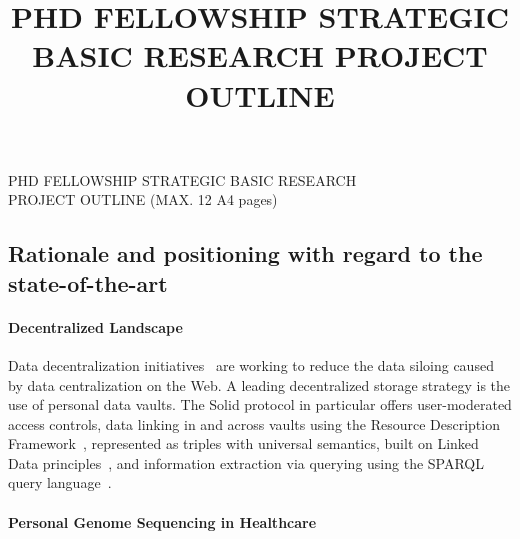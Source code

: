 \documentclass[a4paper,11pt]{article}
\begin{document}
\begin{mdframed}[backgroundcolor=black!17,linecolor=black!0,font=\bfseries]
	\centering
	PHD FELLOWSHIP STRATEGIC BASIC RESEARCH\\
	PROJECT OUTLINE (MAX. 12 A4 pages)\\
	\end{mdframed}
	\vspace{-.5\baselineskip}
\title{PHD FELLOWSHIP STRATEGIC BASIC RESEARCH PROJECT OUTLINE}

\begin{refsection}

\section{Rationale and positioning with regard to the state-of-the-art}

\smallskip

\paragraph{Decentralized Landscape}
Data decentralization initiatives~\cite{solid, mastodon, decentralizednanopubs} are working to reduce the data siloing caused by data centralization on the Web.
A leading decentralized storage strategy is the use of personal data vaults.
The Solid protocol in particular offers user-moderated access controls, data linking in and across vaults using the Resource Description Framework~\cite{spec:rdf}, represented as triples with universal semantics, built on Linked Data principles~\cite{linkeddata}, and information extraction via querying using the SPARQL query language~\cite{spec:sparqllang}.




\paragraph{Personal Genome Sequencing in Healthcare}


\end{refsection}
\end{document}
